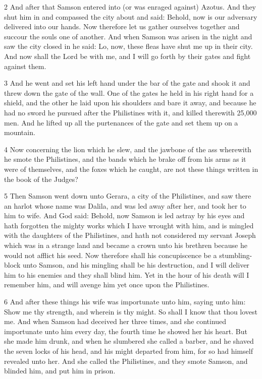 \par 2 And after that Samson entered into (or was enraged against) Azotus. And they shut him in and compassed the city about and said: Behold, now is our adversary delivered into our hands. Now therefore let us gather ourselves together and succour the souls one of another. And when Samson was arisen in the night and saw the city closed in he said: Lo, now, these fleas have shut me up in their city. And now shall the Lord be with me, and I will go forth by their gates and fight against them. 

\par 3 And he went and set his left hand under the bar of the gate and shook it and threw down the gate of the wall. One of the gates he held in his right hand for a shield, and the other he laid upon his shoulders and bare it away, and because he had no sword he pursued after the Philistines with it, and killed therewith 25,000 men. And he lifted up all the purtenances of the gate and set them up on a mountain.

\par 4 Now concerning the lion which he slew, and the jawbone of the ass wherewith he smote the Philistines, and the bands which he brake off from his arms as it were of themselves, and the foxes which he caught, are not these things written in the book of the Judges?

\par 5 Then Samson went down unto Gerara, a city of the Philistines, and saw there an harlot whose name was Dalila, and was led away after her, and took her to him to wife. And God said: Behold, now Samson is led astray by his eyes and hath forgotten the mighty works which I have wrought with him, and is mingled with the daughters of the Philistines, and hath not considered my servant Joseph which was in a strange land and became a crown unto his brethren because he would not afflict his seed. Now therefore shall his concupiscence be a stumbling-block unto Samson, and his mingling shall be his destruction, and I will deliver him to his enemies and they shall blind him. Yet in the hour of his death will I remember him, and will avenge him yet once upon the Philistines.

\par 6 And after these things his wife was importunate unto him, saying unto him: Show me thy strength, and wherein is thy might. So shall I know that thou lovest me. And when Samson had deceived her three times, and she continued importunate unto him every day, the fourth time he showed her his heart. But she made him drunk, and when he slumbered she called a barber, and he shaved the seven locks of his head, and his might departed from him, for so had himself revealed unto her. And she called the Philistines, and they smote Samson, and blinded him, and put him in prison.

